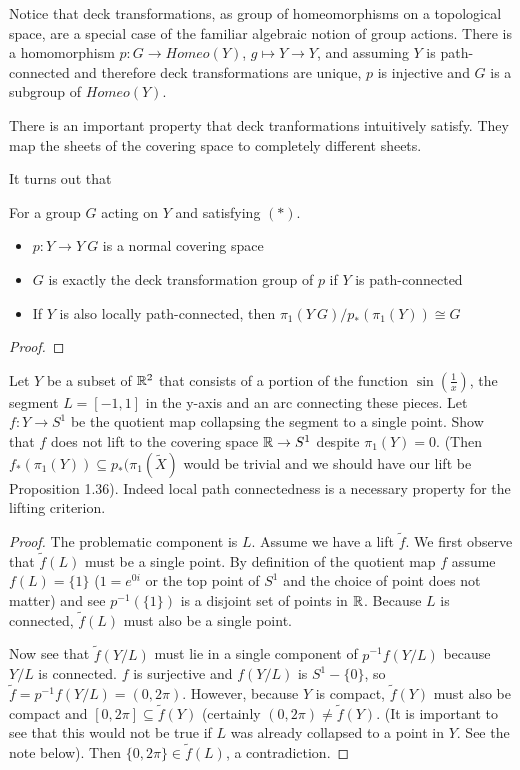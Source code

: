 \documentclass[10pt]{article}
\begin{document}
Notice that deck transformations, as group of homeomorphisms on a topological
space, are a special case of the familiar algebraic notion of group actions.
There is a homomorphism $p: G \to Homeo(Y)$, $g \mapsto Y \to Y$, and assuming
$Y$ is path-connected and therefore deck transformations are unique, $p$ is
injective and $G$ is a subgroup of $Homeo(Y)$.

There is an important property that deck tranformations intuitively satisfy.
They map the sheets of the covering space to completely different sheets.


It turns out that 

\begin{definition}
	For a group $G$ acting on $Y$ and satisfying $(*)$.
	\begin{itemize}
		\item{$p: Y \to Y\ G$ is a normal covering space}
		\item{$G$ is exactly the deck transformation group of $p$ if $Y$ is path-connected}
	  \item{If $Y$ is also locally path-connected, then $\pi_1(Y\ G)/p_*(\pi_1(Y)) \cong G$}
	\end{itemize}
\end{definition}

\begin{proof}
\end{proof}

\begin{exercise}
	Let $Y$ be a subset of $\mathbb{R}^2$ that consists of a portion of the function
	$\sin(\frac{1}{x})$, the segment $L = [-1, 1]$ in the y-axis and an arc
	connecting these pieces. Let $f: Y \to S^1$ be the quotient map collapsing
	the segment to a single point. Show that $f$ does not lift to the covering
	space $\mathbb{R} \to S^1$ despite $\pi_1(Y) = 0$. (Then $f_*(\pi_1(Y)) \subseteq
	p_*(\pi_1(\tilde{X})$ would be trivial and we should have our lift be
	Proposition 1.36). Indeed local path connectedness is a necessary property
	for the lifting criterion.
\end{exercise}

\begin{proof}
	The problematic component is $L$. Assume we have a lift $\tilde{f}$. We first
	observe that $\tilde{f}(L)$ must be a single point. By definition of the
	quotient map $f$ assume $f(L) = \{1\}$ ($1 = e^{0i}$ or the top point of
	$S^1$ and the choice of point does not matter) and see $p^{-1}(\{1\})$ is a
	disjoint set of points in $\mathbb{R}$.  Because $L$ is connected, $\tilde{f}(L)$
	must also be a single point.

	Now see that $\tilde{f}(Y / L)$ must lie in a single component of $p^{-1}f(Y
	/ L)$ because $Y / L$ is connected. $f$ is surjective and $f(Y / L)$ is $S^1
	- \{0\}$, so $\tilde{f} = p^{-1}f(Y/L) = (0, 2\pi)$. However, because $Y$ is
	compact, $\tilde{f}(Y)$ must also be compact and $[0, 2\pi] \subseteq
	\tilde{f}(Y)$ (certainly $(0, 2\pi) \neq \tilde{f}(Y)$. (It is important to
	see that this would not be true if $L$ was already collapsed to a point in
	$Y$. See the note below). Then $\{ 0, 2\pi \} \in \tilde{f}(L)$, a
	contradiction.
\end{proof}
\end{document}
